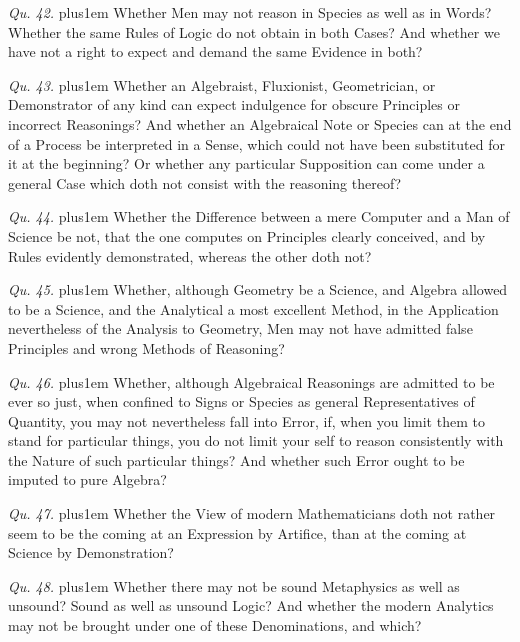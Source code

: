 \item{\it Qu. 42.} \hskip 0pt plus1em
Whether Men may not reason in Species as well as in Words?
Whether the same Rules of Logic do not obtain in both Cases?  And
whether we have not a right to expect and demand the same
Evidence in both?

\item{\it Qu. 43.} \hskip 0pt plus1em
Whether an Algebraist, Fluxionist, Geometrician, or Demonstrator
of any kind can expect indulgence for obscure Principles or
incorrect Reasonings?  And whether an Algebraical Note or Species
can at the end of a Process be interpreted in a Sense, which
could not have been substituted for it at the beginning?  Or
whether any particular Supposition can come under a general Case
which doth not consist with the reasoning thereof?

\item{\it Qu. 44.} \hskip 0pt plus1em
Whether the Difference between a mere Computer and a Man of
Science be not, that the one computes on Principles clearly
conceived, and by Rules evidently demonstrated, whereas the other
doth not?

\item{\it Qu. 45.} \hskip 0pt plus1em
Whether, although Geometry be a Science, and Algebra allowed to
be a Science, and the Analytical a most excellent Method, in the
Application nevertheless of the Analysis to Geometry, Men may not
have admitted false Principles and wrong Methods of Reasoning?

\item{\it Qu. 46.} \hskip 0pt plus1em
Whether, although Algebraical Reasonings are admitted to be ever
so just, when confined to Signs or Species as general
Representatives of Quantity, you may not nevertheless fall into
Error, if, when you limit them to stand for particular things,
you do not limit your self to reason consistently with the Nature
of such particular things?  And whether such Error ought to be
imputed to pure Algebra?

\item{\it Qu. 47.} \hskip 0pt plus1em
Whether the View of modern Mathematicians doth not rather seem to
be the coming at an Expression by Artifice, than at the coming at
Science by Demonstration?

\item{\it Qu. 48.} \hskip 0pt plus1em
Whether there may not be sound Metaphysics as well as unsound?
Sound as well as unsound Logic?  And whether the modern Analytics
may not be brought under one of these Denominations, and which?


